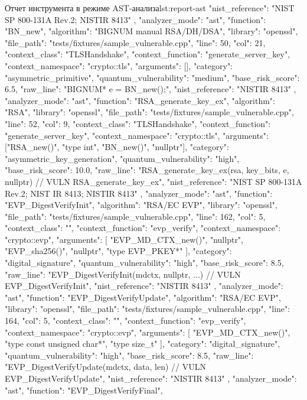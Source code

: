\documentclass{itmo-vkr}
\begin{document}
\begin{itmolisting}[JSON]{Отчет инструмента в режиме AST-анализа}{lst:report-ast}
{{			"nist_reference": "NIST SP 800-131A Rev.2; NISTIR 8413"
		},
		{
			"analyzer_mode": "ast",
			"function": "BN_new",
			"algorithm": "BIGNUM manual RSA/DH/DSA",
			"library": "openssl",
			"file_path": "tests/fixtures/sample_vulnerable.cpp",
			"line": 50,
			"col": 21,
			"context_class": "TLSHandshake",
			"context_function": "generate_server_key",
			"context_namespace": "crypto::tls",
			"arguments": [],
			"category": "asymmetric_primitive",
			"quantum_vulnerability": "medium",
			"base_risk_score": 6.5,
			"raw_line": "BIGNUM* e = BN_new();",
			"nist_reference": "NISTIR 8413"
		},
		{
			"analyzer_mode": "ast",
			"function": "RSA_generate_key_ex",
			"algorithm": "RSA",
			"library": "openssl",
			"file_path": "tests/fixtures/sample_vulnerable.cpp",
			"line": 52,
			"col": 9,
			"context_class": "TLSHandshake",
			"context_function": "generate_server_key",
			"context_namespace": "crypto::tls",
			"arguments": ["RSA_new()", "type int", "BN_new()", "nullptr"],
			"category": "asymmetric_key_generation",
			"quantum_vulnerability": "high",
			"base_risk_score": 10.0,
			"raw_line": "RSA_generate_key_ex(rsa, key_bits, e, nullptr) // VULN RSA_generate_key_ex",
			"nist_reference": "NIST SP 800-131A Rev.2; NIST IR 8413; NISTIR 8413"
		},
		{
			"analyzer_mode": "ast",
			"function": "EVP_DigestVerifyInit",
			"algorithm": "RSA/EC EVP",
			"library": "openssl",
			"file_path": "tests/fixtures/sample_vulnerable.cpp",
			"line": 162,
			"col": 5,
			"context_class": "",
			"context_function": "evp_verify",
			"context_namespace": "crypto::evp",
			"arguments": [
			"EVP_MD_CTX_new()",
			"nullptr",
			"EVP_sha256()",
			"nullptr",
			"type EVP_PKEY*"
			],
			"category": "digital_signature",
			"quantum_vulnerability": "high",
			"base_risk_score": 8.5,
			"raw_line": "EVP_DigestVerifyInit(mdctx, nullptr, ...) // VULN EVP_DigestVerifyInit",
			"nist_reference": "NISTIR 8413"
		},
		{
			"analyzer_mode": "ast",
			"function": "EVP_DigestVerifyUpdate",
			"algorithm": "RSA/EC EVP",
			"library": "openssl",
			"file_path": "tests/fixtures/sample_vulnerable.cpp",
			"line": 164,
			"col": 5,
			"context_class": "",
			"context_function": "evp_verify",
			"context_namespace": "crypto::evp",
			"arguments": [
			"EVP_MD_CTX_new()",
			"type const unsigned char*",
			"type size_t"
			],
			"category": "digital_signature",
			"quantum_vulnerability": "high",
			"base_risk_score": 8.5,
			"raw_line": "EVP_DigestVerifyUpdate(mdctx, data, len) // VULN EVP_DigestVerifyUpdate",
			"nist_reference": "NISTIR 8413"
		},
		{
			"analyzer_mode": "ast",
			"function": "EVP_DigestVerifyFinal",
}}
\end{itmolisting}
\end{document}
